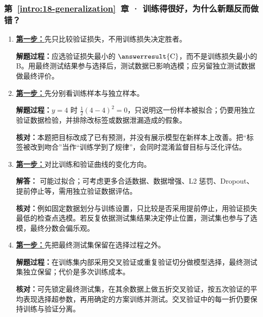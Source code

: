 \subsubsection*{第~\ref*{intro:18-generalization}~章 · 训练得很好，为什么新题反而做错？}
\begin{enumerate}[label={},leftmargin=4.8em,itemsep=4pt]
\item[\textbf{C-019.}] \leavevmode{}\label{solution:C-019}\label{solution:validation-checkpoint-choice}\hyperref[exercise:validation-checkpoint-choice]{\textbf{第一步：}}先只比较验证损失，不用训练损失决定胜者。\par\nobreak
\textbf{解题过程：}应选验证损失最小的 $\answerresult{\text{C}}$，而不是训练损失最小的 B。用最终测试结果参与选择后，测试数据已影响选模；应另留独立测试数据做最终评价。
\item[\textbf{C-020.}] \leavevmode{}\label{solution:C-020}\label{solution:zero-loss-generalization}\hyperref[exercise:zero-loss-generalization]{\textbf{第一步：}}先分别看训练样本与独立样本。\par\nobreak
\textbf{解题过程：}$y=4$ 时 $\tfrac12(4-4)^2=0$，只说明这一份样本被拟合；仍要用独立验证数据检验，并排除改标签或数据泄漏造成的假象。\par\textbf{核对：}本题把目标改成了已有预测，并没有展示模型在新样本上改善。把“标签被改到吻合”当作“训练学到了规律”，会同时混淆监督目标与泛化评估。
\item[\textbf{C-021.}] \leavevmode{}\label{solution:C-021}\label{solution:validation-overfitting}\hyperref[exercise:validation-overfitting]{\textbf{第一步：}}对比训练和验证曲线的变化方向。\par\nobreak
\textbf{解答：} 可能过拟合；可考虑更多合适数据、数据增强、L2 惩罚、Dropout、提前停止等，需用独立验证数据评估。\par\textbf{核对：}例如固定数据划分与训练设置，只比较是否采用提前停止，用验证损失最低的检查点选模。若反复依据测试集结果决定停止位置，测试集也参与了选模，最终分数会偏乐观。
\item[\textbf{C-022.}] \leavevmode{}\label{solution:C-022}\label{solution:small-data-validation}\hyperref[exercise:small-data-validation]{\textbf{第一步：}}先把最终测试集保留在选择过程之外。\par\nobreak\textbf{解题过程：}在训练集内部采用交叉验证或重复验证切分做模型选择，最终测试集独立保留；代价是多次训练成本。\par\textbf{核对：}可先锁定最终测试集，在其余数据上做五折交叉验证，按五次验证的平均表现选择超参数，再用确定的方案训练并测试。交叉验证中的每一折仍要保持训练与验证分离。
\end{enumerate}
